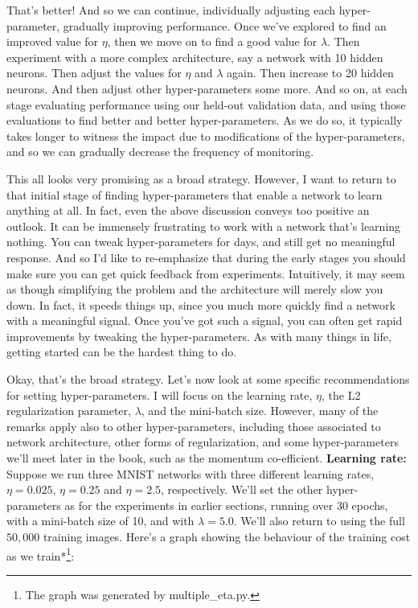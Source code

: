 That's better! And so we can continue, individually adjusting each hyper-parameter, gradually improving performance. Once we've explored to find an improved value for $\eta$, then we move on to find a good value for $\lambda$. Then experiment with a more complex architecture, say a network with 10 hidden neurons. Then adjust the values for $\eta$ and $\lambda$ again. Then increase to 20 hidden neurons. And then adjust other hyper-parameters some more. And so on, at each stage evaluating performance using our held-out validation data, and using those evaluations to find better and better hyper-parameters. As we do so, it typically takes longer to witness the impact due to modifications of the hyper-parameters, and so we can gradually decrease the frequency of monitoring.


This all looks very promising as a broad strategy. However, I want to return to that initial stage of finding hyper-parameters that enable a network to learn anything at all. In fact, even the above discussion conveys too positive an outlook. It can be immensely frustrating to work with a network that's learning nothing. You can tweak hyper-parameters for days, and still get no meaningful response. And so I'd like to re-emphasize that during the early stages you should make sure you can get quick feedback from experiments. Intuitively, it may seem as though simplifying the problem and the architecture will merely slow you down. In fact, it speeds things up, since you much more quickly find a network with a meaningful signal. Once you've got such a signal, you can often get rapid improvements by tweaking the hyper-parameters. As with many things in life, getting started can be the hardest thing to do.


Okay, that's the broad strategy. Let's now look at some specific recommendations for setting hyper-parameters. I will focus on the learning rate, $\eta$, the L2 regularization parameter, $\lambda$, and the mini-batch size. However, many of the remarks apply also to other hyper-parameters, including those associated to network architecture, other forms of regularization, and some hyper-parameters we'll meet later in the book, such as the momentum co-efficient. \textbf{Learning rate:} Suppose we run three MNIST networks with three different learning rates, $\eta = 0.025$, $\eta = 0.25$ and $\eta = 2.5$, respectively. We'll set the other hyper-parameters as for the experiments in earlier sections, running over 30 epochs, with a mini-batch size of 10, and with $\lambda = 5.0$. We'll also return to using the full $50,000$ training images. Here's a graph showing the behaviour of the training cost as we train*\footnote{The graph was generated by multiple\_\allowbreak{}eta.py.}:


